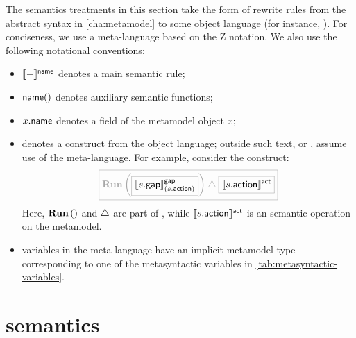 The semantics treatments in this section take the form of rewrite rules from
the abstract syntax in \cref{cha:metamodel} to some object language (for
instance, \tockcsp).
For conciseness, we use a meta-language based on the Z notation.
We also use the following notational conventions:

\begin{itemize}
\item
	\(\llbracket - \rrbracket^{\mathsf{name}}\) denotes a main semantic rule;
\item
	\(\mathsf{name}()\) denotes auxiliary semantic functions;
\item
	\(x.\mathsf{name}\) denotes a field of the metamodel object \(x\);
\item
	 denotes a construct from the object
	language; outside such text, or ,
	assume use of the meta-language.  For example, consider the \tockcsp{}
	construct:
	\[\tlang{
		\runproc{\olang{\gapsema{\field{\astep}{gap}}{\field{\astep}{action}}}}
		\interrupt \olang{\actsema{\field{\astep}{action}}}
	}\]
	Here, \(\operatorname{\mathbf{Run}}\left(\right)\) and \(\mathbin{\triangle}\) are part of \tockcsp, while
	\(\llbracket s.\mathsf{action} \rrbracket^{\mathsf{act}}\) is an semantic operation on the
	\langname{} metamodel.
\item
	variables in the meta-language have an implicit metamodel type
	corresponding to one of the metasyntactic variables in
	\cref{tab:metasyntactic-variables}.
\end{itemize}

\section{\tockcsp{} semantics}\label{sec:semantics-tockcsp}

